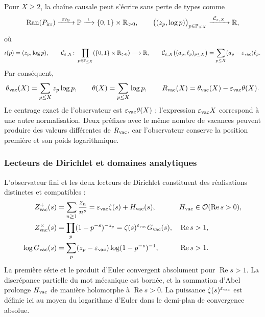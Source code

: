 Pour \(X\geq2\), la chaîne causale peut s’écrire sans perte de types
comme
\begin{equation}
 \operatorname{Ran}(P_{\rm irr})
 \xrightarrow{\ \operatorname{ev}_9\ }
 \mathbb P
 \xrightarrow{\ \iota\ }
 \{0,1\}\times\mathbb R_{>0},
 \qquad
 \bigl((z_p,\log p)\bigr)_{p\in\mathbb P_{\leq X}}
 \xrightarrow{\ \mathcal C_{\varepsilon,X}\ }
 \mathbb R,
 \label{eq:f051-typed-chain}
\end{equation}
où
\[
 \iota(p)=(z_p,\log p),
 \qquad
 \mathcal C_{\varepsilon,X}\colon
 \prod_{p\in\mathbb P_{\leq X}}
       (\{0,1\}\times\mathbb R_{>0})\longrightarrow\mathbb R,
 \qquad
 \mathcal C_{\varepsilon,X}\bigl((a_p,\ell_p)_{p\leq X}\bigr)
 =\sum_{p\leq X}(a_p-\varepsilon_{\rm vac})\ell_p .
\]
Par conséquent,
\begin{equation}
 \theta_{\rm vac}(X)=\sum_{p\leq X}z_p\log p,
 \qquad
 \theta(X)=\sum_{p\leq X}\log p,
 \qquad
 R_{\rm vac}(X)=\theta_{\rm vac}(X)
                   -\varepsilon_{\rm vac}\theta(X).
 \label{eq:f051-rvac-chebyshev}
\end{equation}
Le centrage exact de l’observateur est
\(\varepsilon_{\rm vac}\theta(X)\) ; l’expression
\(\varepsilon_{\rm vac}X\) correspond à une autre normalisation. Deux préfixes
avec le même nombre de vacances peuvent produire des valeurs différentes de
\(R_{\rm vac}\), car l’observateur conserve la position première et son poids
logarithmique.

\subsubsection{Lecteurs de Dirichlet et domaines analytiques}

L’observateur fini et les deux lecteurs de Dirichlet constituent
des réalisations distinctes et compatibles :
\begin{align}
 Z^{+}_{\rm vac}(s)
   &=\sum_{n\geq1}\frac{z_n}{n^s}
     =\varepsilon_{\rm vac}\zeta(s)+H_{\rm vac}(s),
 & H_{\rm vac}&\in\mathcal O(\operatorname{Re}s>0),
 \nonumber\\
 Z^{\times}_{\rm vac}(s)
   &=\prod_p(1-p^{-s})^{-z_p}
     =\zeta(s)^{\varepsilon_{\rm vac}}G_{\rm vac}(s),
 & \operatorname{Re}s&>1,
 \label{eq:f051-dirichlet-readers}\\
 \log G_{\rm vac}(s)
   &=\sum_p(z_p-\varepsilon_{\rm vac})
       \log(1-p^{-s})^{-1},
 & \operatorname{Re}s&>1.
 \nonumber
\end{align}
La première série et le produit d’Euler convergent absolument pour
\(\operatorname{Re}s>1\). La discrépance partielle du mot mécanique
est bornée, et la sommation d’Abel prolonge \(H_{\rm vac}\) de manière
holomorphe à \(\operatorname{Re}s>0\). La puissance
\(\zeta(s)^{\varepsilon_{\rm vac}}\) est définie ici au moyen du logarithme
d’Euler dans le demi-plan de convergence absolue.

